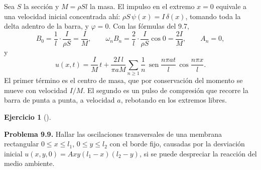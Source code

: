 \documentclass[
  spanish,
  a4paper,
]{scrbook}
\theoremstyle{definition}
\theoremstyle{plain}
\theoremstyle{definition}
\theoremstyle{plain}
\theoremstyle{definition}
\newtheorem{exercise}{Ejercicio}[chapter]
\theoremstyle{remark}
\begin{document}
\begin{tcolorbox}[enhanced jigsaw, arc=.35mm, bottomrule=.15mm, bottomtitle=1mm, breakable, colback=white, colbacktitle=quarto-callout-tip-color!10!white, colframe=quarto-callout-tip-color-frame, coltitle=black, left=2mm, leftrule=.75mm, opacityback=0, opacitybacktitle=0.6, rightrule=.15mm, title=\textcolor{quarto-callout-tip-color}{\faLightbulb}\hspace{0.5em}{Solución}, titlerule=0mm, toprule=.15mm, toptitle=1mm]

Sea \(S\) la sección y \(M = \rho Sl\) la masa. El impulso en el extremo
\(x = 0\) equivale a una velocidad inicial concentrada ahí:
\(\rho S\,\psi(x) = I\,\delta(x)\), tomando toda la delta adentro de la
barra, y \(\varphi = 0\). Con las fórmulas del 9.7, \[
B_0 = \frac1l\cdot\frac{I}{\rho S} = \frac IM,\qquad
\omega_nB_n = \frac2l\cdot\frac{I}{\rho S}\cos 0 = \frac{2I}{M},\qquad A_n = 0,
\] y \[
u(x,t) = \frac IM\,t + \frac{2I\,l}{\pi a M}\sum_{n\ge1}\frac1n\,\operatorname{sen}\frac{n\pi at}{l}\,\cos\frac{n\pi x}{l}.
\] El primer término es el centro de masa, que por conservación del
momento se mueve con velocidad \(I/M\). El segundo es un pulso de
compresión que recorre la barra de punta a punta, a velocidad \(a\),
rebotando en los extremos libres.

\end{tcolorbox}

\begin{exercise}[]\protect\hypertarget{exr-hip-p9}{}\label{exr-hip-p9}

\textbf{Problema 9.9.} Hallar las oscilaciones transversales de una
membrana rectangular \(0\le x\le l_1\), \(0\le y\le l_2\) con el borde
fijo, causadas por la desviación inicial
\(u(x,y,0) = Axy(l_1-x)(l_2-y)\), si se puede despreciar la reacción del
medio ambiente.

\end{exercise}
\end{document}
